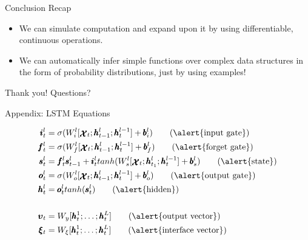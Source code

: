 \documentclass{beamer}
\newcommand{\xx}{\pmb{\raisebox{-1.5pt}{$\mathcal{X}$}}}
\newcommand{\hh}{\pmb{h}}
\newcommand{\ii}{\pmb{i}}
\newcommand{\oo}{\pmb{o}}
\newcommand{\ff}{\pmb{f}}
\newcommand{\Ss}{\pmb{s}}
\newcommand{\Cc}{\pmb{c}}
\newcommand{\bb}{\pmb{b}}
\begin{document}
\begin{frame}{Conclusion}
	\alert{Recap}\\
	\begin{itemize}
	\item We can simulate computation and expand upon it by using differentiable, continuous operations.\\
	\item[] We can automatically infer simple functions over complex data structures in the form of \alert{probability distributions}, just by using examples!\\
	\end{itemize}
\end{frame}

\begin{frame}{Thank you!}
	\centering
	\alert{Questions?}
\end{frame}

\begin{frame}{Appendix: LSTM Equations}

	\begin{align}
	\ii_t^l &= \sigma(W_i^l[\xx_t;\hh_{t-1}^l;\hh_t^{l-1}]+\bb_i^l)   \tag{\alert{input gate}}\\
	\ff_t^l &= \sigma(W_f^l[\xx_t;\hh_{t-1}^l;\hh_t^{l-1}]+\bb_f^l)	\tag{\alert{forget gate}}\\
	\Ss_t^l &= \ff_t^l\Ss_{t-1}^l + \ii_t^ltanh(W_s^l[\xx_t;\hh_{t_1}^l;\hh_t^{l-1}] + \bb_s^l)		\tag{\alert{state}}\\
	\oo_t^l &= \sigma(W_o^l[\xx_t;\hh_{t-1}^l;\hh_t^{l-1}]+\bb_o^l)		\tag{\alert{output gate}}\\
	\hh_t^l &= \oo_t^ltanh(\Ss_t^l)		\tag{\alert{hidden}}\\
	\nonumber \\ 
	\pmb{\upsilon}_t &= W_y[\hh_t^1;\dots;\hh_t^L]		\tag{\alert{output vector}}\\
	\pmb{\xi}_t &= W_{\xi}[\hh_t^1;\dots;\hh_t^L]		\tag{\alert{interface vector}}
	\end{align}
\end{frame}
\end{document}
